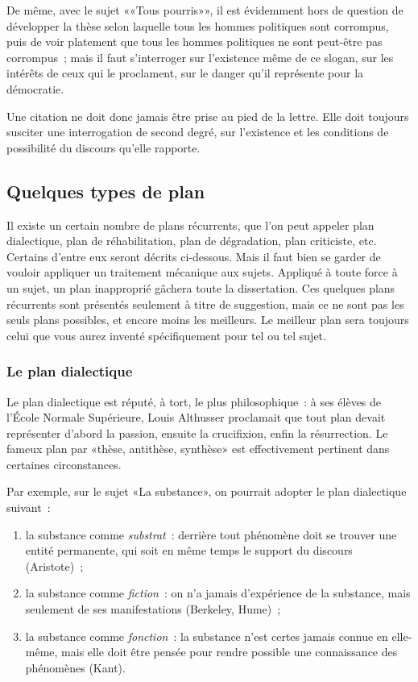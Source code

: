 \documentclass[a4paper,11pt]{article}
\begin{document}
\par

De même, avec le sujet ««Tous pourris»», il est évidemment hors de
question de développer la thèse selon laquelle tous les hommes
politiques sont corrompus, puis de voir platement que tous les hommes
politiques ne sont peut-être pas corrompus~; mais il faut s'interroger
sur l'existence même de ce slogan, sur les intérêts de ceux qui le
proclament, sur le danger qu'il représente pour la démocratie.

\par

Une citation ne doit donc jamais être prise au pied de la lettre. Elle
doit toujours susciter une interrogation de second degré, sur
l'existence et les conditions de possibilité du discours qu'elle
rapporte.



\subsection{Quelques types de plan}

Il existe un certain nombre de plans récurrents, que l'on peut appeler
plan dialectique, plan de réhabilitation, plan de dégradation, plan
criticiste, etc. Certains d'entre eux seront décrits ci-dessous. Mais il
faut bien se garder de vouloir appliquer un traitement mécanique aux
sujets. Appliqué à toute force à un sujet, un plan inapproprié gâchera
toute la dissertation. Ces quelques plans récurrents sont présentés
seulement à titre de suggestion, mais ce ne sont pas les seuls plans
possibles, et encore moins les meilleurs. Le meilleur plan sera toujours
celui que vous aurez inventé spécifiquement pour tel ou tel sujet.


\subsubsection{Le plan dialectique}

Le plan dialectique est réputé, à tort, le plus philosophique~: à ses
élèves de l'École Normale Supérieure, Louis Althusser proclamait que
tout plan devait représenter d'abord la passion, ensuite la crucifixion,
enfin la résurrection. Le fameux plan par «thèse, antithèse, synthèse»
est effectivement pertinent dans certaines circonstances.

\par

Par exemple, sur le sujet «La substance», on pourrait adopter le plan
dialectique suivant~:
\begin{enumerate}
\item la substance comme \emph{substrat}~: derrière tout phénomène doit
  se trouver une entité permanente, qui soit en même temps le support du
  discours (Aristote)~;
\item la substance comme \emph{fiction}~: on n'a jamais d'expérience de
  la substance, mais seulement de ses manifestations (Berkeley, Hume)~;
\item la substance comme \emph{fonction}~: la substance n'est certes
  jamais connue en elle-même, mais elle doit être pensée pour rendre
  possible une connaissance des phénomènes (Kant).
\end{enumerate}
\end{document}
